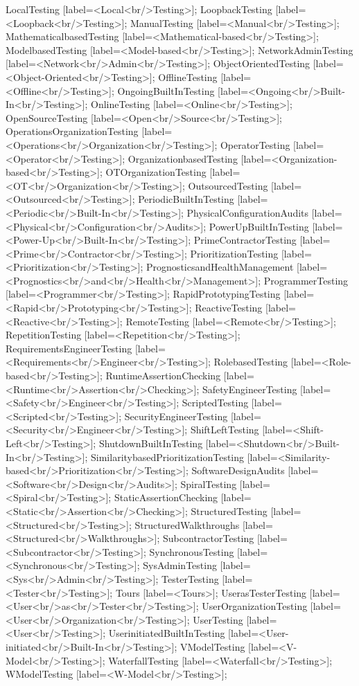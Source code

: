 \documentclass{article}
\begin{document}
{LocalTesting [label=<Local<br/>Testing>];
LoopbackTesting [label=<Loopback<br/>Testing>];
ManualTesting [label=<Manual<br/>Testing>];
MathematicalbasedTesting [label=<Mathematical-based<br/>Testing>];
ModelbasedTesting [label=<Model-based<br/>Testing>];
NetworkAdminTesting [label=<Network<br/>Admin<br/>Testing>];
ObjectOrientedTesting [label=<Object-Oriented<br/>Testing>];
OfflineTesting [label=<Offline<br/>Testing>];
OngoingBuiltInTesting [label=<Ongoing<br/>Built-In<br/>Testing>];
OnlineTesting [label=<Online<br/>Testing>];
OpenSourceTesting [label=<Open<br/>Source<br/>Testing>];
OperationsOrganizationTesting [label=<Operations<br/>Organization<br/>Testing>];
OperatorTesting [label=<Operator<br/>Testing>];
OrganizationbasedTesting [label=<Organization-based<br/>Testing>];
OTOrganizationTesting [label=<OT<br/>Organization<br/>Testing>];
OutsourcedTesting [label=<Outsourced<br/>Testing>];
PeriodicBuiltInTesting [label=<Periodic<br/>Built-In<br/>Testing>];
PhysicalConfigurationAudits [label=<Physical<br/>Configuration<br/>Audits>];
PowerUpBuiltInTesting [label=<Power-Up<br/>Built-In<br/>Testing>];
PrimeContractorTesting [label=<Prime<br/>Contractor<br/>Testing>];
PrioritizationTesting [label=<Prioritization<br/>Testing>];
PrognosticsandHealthManagement [label=<Prognostics<br/>and<br/>Health<br/>Management>];
ProgrammerTesting [label=<Programmer<br/>Testing>];
RapidPrototypingTesting [label=<Rapid<br/>Prototyping<br/>Testing>];
ReactiveTesting [label=<Reactive<br/>Testing>];
RemoteTesting [label=<Remote<br/>Testing>];
RepetitionTesting [label=<Repetition<br/>Testing>];
RequirementsEngineerTesting [label=<Requirements<br/>Engineer<br/>Testing>];
RolebasedTesting [label=<Role-based<br/>Testing>];
RuntimeAssertionChecking [label=<Runtime<br/>Assertion<br/>Checking>];
SafetyEngineerTesting [label=<Safety<br/>Engineer<br/>Testing>];
ScriptedTesting [label=<Scripted<br/>Testing>];
SecurityEngineerTesting [label=<Security<br/>Engineer<br/>Testing>];
ShiftLeftTesting [label=<Shift-Left<br/>Testing>];
ShutdownBuiltInTesting [label=<Shutdown<br/>Built-In<br/>Testing>];
SimilaritybasedPrioritizationTesting [label=<Similarity-based<br/>Prioritization<br/>Testing>];
SoftwareDesignAudits [label=<Software<br/>Design<br/>Audits>];
SpiralTesting [label=<Spiral<br/>Testing>];
StaticAssertionChecking [label=<Static<br/>Assertion<br/>Checking>];
StructuredTesting [label=<Structured<br/>Testing>];
StructuredWalkthroughs [label=<Structured<br/>Walkthroughs>];
SubcontractorTesting [label=<Subcontractor<br/>Testing>];
SynchronousTesting [label=<Synchronous<br/>Testing>];
SysAdminTesting [label=<Sys<br/>Admin<br/>Testing>];
TesterTesting [label=<Tester<br/>Testing>];
Tours [label=<Tours>];
UserasTesterTesting [label=<User<br/>as<br/>Tester<br/>Testing>];
UserOrganizationTesting [label=<User<br/>Organization<br/>Testing>];
UserTesting [label=<User<br/>Testing>];
UserinitiatedBuiltInTesting [label=<User-initiated<br/>Built-In<br/>Testing>];
VModelTesting [label=<V-Model<br/>Testing>];
WaterfallTesting [label=<Waterfall<br/>Testing>];
WModelTesting [label=<W-Model<br/>Testing>];


}
\end{document}
